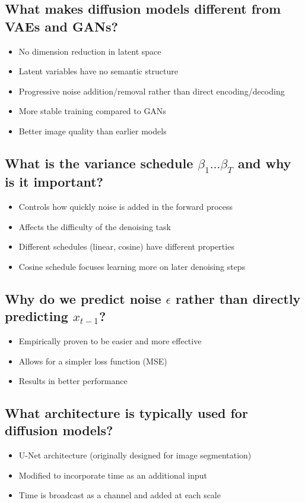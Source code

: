 \subsection*{What makes diffusion models different from VAEs and GANs?}
\begin{itemize}
    \item No dimension reduction in latent space
    \item Latent variables have no semantic structure
    \item Progressive noise addition/removal rather than direct encoding/decoding
    \item More stable training compared to GANs
    \item Better image quality than earlier models
\end{itemize}

\subsection*{What is the variance schedule $\beta_1 \ldots \beta_T$ and why is it important?}
\begin{itemize}
    \item Controls how quickly noise is added in the forward process
    \item Affects the difficulty of the denoising task
    \item Different schedules (linear, cosine) have different properties
    \item Cosine schedule focuses learning more on later denoising steps
\end{itemize}

\subsection*{Why do we predict noise $\epsilon$ rather than directly predicting $x_{t-1}$?}
\begin{itemize}
    \item Empirically proven to be easier and more effective
    \item Allows for a simpler loss function (MSE)
    \item Results in better performance
\end{itemize}

\subsection*{What architecture is typically used for diffusion models?}
\begin{itemize}
    \item U-Net architecture (originally designed for image segmentation)
    \item Modified to incorporate time as an additional input
    \item Time is broadcast as a channel and added at each scale
\end{itemize}

